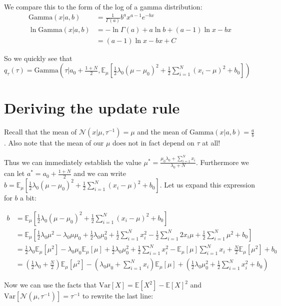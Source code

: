 \documentclass[11pt]{article}
\begin{document}
We compare this to the form of the log of a gamma distribution:
\begin{align*}
\text{Gamma}(x | a, b) &= \frac{1}{\Gamma(a)} b^a x^{a-1} e^{-bx} \\
\ln \text{Gamma}(x | a, b) &= -\ln \Gamma(a) + a \ln b + (a - 1) \ln x - bx \\
&= (a - 1) \ln x - bx + C
\end{align*}

So we quickly see that $q_\tau(\tau) = \text{Gamma}(\tau | a_0 + \frac{1 + N}{2}, \mathbb{E}_\mu[\frac{1}{2}\lambda_0(\mu - \mu_0)^2 + \frac{1}{2}\sum_{i=1}^N (x_i - \mu)^2 + b_0 ])$

\section{Deriving the update rule}
Recall that the mean of $\mathcal{N}(x | \mu, \tau^{-1}) = \mu$ and the mean of $\text{Gamma}(x | a, b) = \frac{a}{b}$.
Also note that the mean of our $\mu$ does not in fact depend on $\tau$ at all!

Thus we can immediately establish the value $\mu^* = \frac{\mu_0\lambda_0 + \sum_{i=1}^{N} x_i}{\lambda_0 + N}$.
Furthermore we can let $a^* = a_0 + \frac{1 + N}{2}$ and we can write $b = \mathbb{E}_\mu[\frac{1}{2}\lambda_0(\mu - \mu_0)^2 + \frac{1}{2}\sum_{i=1}^N (x_i - \mu)^2 + b_0]$.
Let us expand this expression for $b$ a bit:

\begin{align*}
b &= \mathbb{E}_\mu[\frac{1}{2}\lambda_0(\mu - \mu_0)^2 + \frac{1}{2}\sum_{i=1}^N (x_i - \mu)^2 + b_0] \\
&= \mathbb{E}_\mu[ \frac{1}{2}\lambda_0\mu^2 - \lambda_0\mu\mu_0 + \frac{1}{2}\lambda_0\mu_0^2 + \frac{1}{2}\sum_{i=1}^N x_i^2 - \frac{1}{2}\sum_{i=1}^N 2x_i\mu + \frac{1}{2}\sum_{i=1}^N \mu^2 + b_0] \\
&= \frac{1}{2}\lambda_0\mathbb{E}_\mu[\mu^2] - \lambda_0\mu_0 \mathbb{E}_\mu[\mu] + \frac{1}{2}\lambda_0\mu_0^2 + \frac{1}{2}\sum_{i=1}^N x_i^2 - \mathbb{E}_\mu[\mu] \sum_{i=1}^N x_i + \frac{N}{2}\mathbb{E}_\mu[\mu^2] + b_0 \\
&= (\frac{1}{2}\lambda_0 + \frac{N}{2}) \mathbb{E}_\mu[\mu^2] - (\lambda_0\mu_0 + \sum_{i=1}^Nx_i) \mathbb{E}_\mu[\mu] + (\frac{1}{2}\lambda_0\mu_0^2 + \frac{1}{2}\sum_{i=1}^N x_i^2 + b_0)
\end{align*}

Now we can use the facts that $\text{Var}[X] = \mathbb{E}[X^2] - \mathbb{E}[X]^2$ and $\text{Var}[\mathcal{N}(\mu, \tau^{-1})] = \tau^{-1}$ to rewrite the last line:
\end{document}

